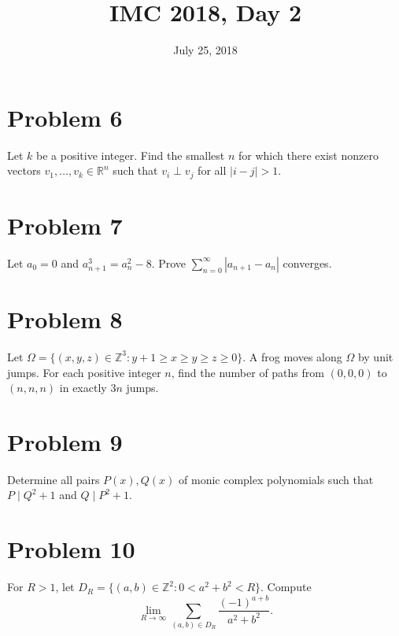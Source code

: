 \documentclass{article}
\title{IMC 2018, Day 2}
\date{July 25, 2018}
\begin{document}
\maketitle

\section*{Problem 6}
Let $k$ be a positive integer. Find the smallest $n$ for which there exist nonzero vectors $v_1, \ldots, v_k \in \mathbb{R}^n$ such that $v_i \perp v_j$ for all $|i - j| > 1$.

\section*{Problem 7}
Let $a_0 = 0$ and $a_{n+1}^3 = a_n^2 - 8$. Prove $\sum_{n=0}^\infty |a_{n+1} - a_n|$ converges.

\section*{Problem 8}
Let $\Omega = \{(x,y,z) \in \mathbb{Z}^3 : y + 1 \geq x \geq y \geq z \geq 0\}$. A frog moves along $\Omega$ by unit jumps. For each positive integer $n$, find the number of paths from $(0,0,0)$ to $(n,n,n)$ in exactly $3n$ jumps.

\section*{Problem 9}
Determine all pairs $P(x), Q(x)$ of monic complex polynomials such that $P \mid Q^2 + 1$ and $Q \mid P^2 + 1$.

\section*{Problem 10}
For $R > 1$, let $D_R = \{(a,b) \in \mathbb{Z}^2 : 0 < a^2 + b^2 < R\}$. Compute
\[ \lim_{R \to \infty} \sum_{(a,b) \in D_R} \frac{(-1)^{a+b}}{a^2 + b^2}. \]
\end{document}
